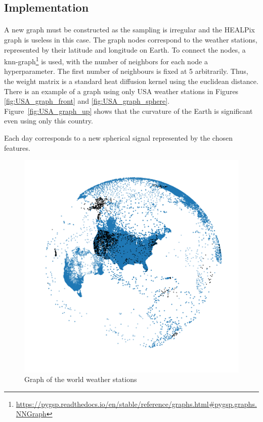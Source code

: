\documentclass[11pt]{report}
\begin{document}
\subsection{Implementation}
\paragraph*{}
A new graph must be constructed as the sampling is irregular and the HEALPix graph is useless in this case. The graph nodes correspond to the weather stations, represented by their latitude and longitude on Earth. To connect the nodes, a knn-graph\footnote{\url{https://pygsp.readthedocs.io/en/stable/reference/graphs.html\#pygsp.graphs.NNGraph}} is used, with the number of neighbors for each node a hyperparameter. The first number of neighbours is fixed at 5 arbitrarily. Thus, the weight matrix is a standard heat diffusion kernel using the euclidean distance. There is an example of a graph using only USA weather stations in Figures \ref{fig:USA_graph_front} and \ref{fig:USA_graph_sphere}. Figure~\ref{fig:USA_graph_up} shows that the curvature of the Earth is significant even using only this country.

Each day corresponds to a new spherical signal represented by the chosen features.

\begin{figure}[!ht]
    \centering
    \includegraphics[width=0.5\linewidth]{world_graph_USA.png}
    \caption{Graph of the world weather stations}
    \label{fig:world_graph}
\end{figure}
\end{document}
